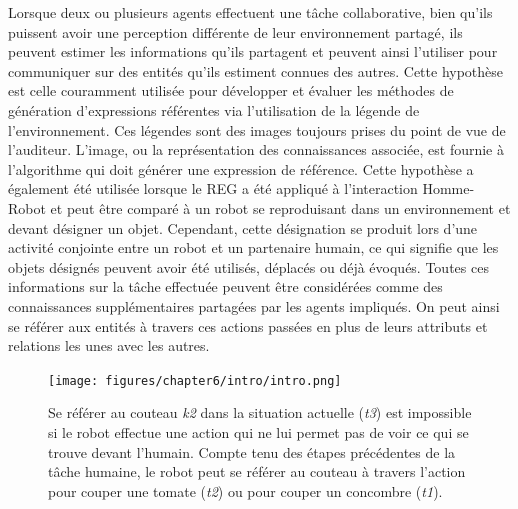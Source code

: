 Lorsque deux ou plusieurs agents effectuent une tâche collaborative, bien qu'ils puissent avoir une perception différente de leur environnement partagé, ils peuvent estimer les informations qu'ils partagent et peuvent ainsi l'utiliser pour communiquer sur des entités qu'ils estiment connues des autres. Cette hypothèse est celle couramment utilisée pour développer et évaluer les méthodes de génération d'expressions référentes via l'utilisation de la légende de l'environnement\cite{duboue_2015_evaluating}. Ces légendes sont des images toujours prises du point de vue de l'auditeur. L'image, ou la représentation des connaissances associée, est fournie à l'algorithme qui doit générer une expression de référence. Cette hypothèse a également été utilisée lorsque le REG a été appliqué à l'interaction Homme-Robot et peut être comparé à un robot se reproduisant dans un environnement et devant désigner un objet. Cependant, cette désignation se produit lors d'une activité conjointe entre un robot et un partenaire humain, ce qui signifie que les objets désignés peuvent avoir été utilisés, déplacés ou déjà évoqués. Toutes ces informations sur la tâche effectuée peuvent être considérées comme des connaissances supplémentaires partagées par les agents impliqués. On peut ainsi se référer aux entités à travers ces actions passées en plus de leurs attributs et relations les unes avec les autres.

\begin{figure}[ht!]
\centering
\texttt{[image: figures/chapter6/intro/intro.png]}
\caption{\label{fig:annex_chap6_intro} Se référer au couteau \textit{k2} dans la situation actuelle (\textit{t3}) est impossible si le robot effectue une action qui ne lui permet pas de voir ce qui se trouve devant l'humain. Compte tenu des étapes précédentes de la tâche humaine, le robot peut se référer au couteau à travers l'action pour couper une tomate (\textit{t2}) ou pour couper un concombre (\textit{t1}).}
\end{figure}

